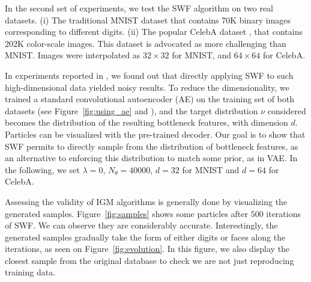 In the second set of experiments, we test the SWF algorithm on two real datasets. (i) The traditional MNIST dataset that contains 70K binary images corresponding to different digits. (ii) The popular CelebA dataset \cite{liu2015faceattributes}, that contains $202$K color-scale images. This dataset is advocated as more challenging than MNIST. Images were interpolated as $32\times 32$ for MNIST, and $64\times 64$ for CelebA.

In experiments reported in \supp, we found out that directly applying SWF to such high-dimensional data yielded noisy results. To reduce the dimensionality, we trained a standard convolutional autoencoder (AE) on the training set of both datasets (see Figure~\ref{fig:using_ae} and \supp), and the target distribution $\nu$ considered becomes the distribution of the resulting bottleneck features,
with dimension $d$. Particles can be visualized with the pre-trained decoder.
Our goal is to show that SWF permits to directly sample from the distribution of bottleneck features, as an alternative to enforcing this distribution to match some prior, as in VAE. In the following, we set $\lambda=0$, $N_\theta=40000$, $d=32$ for MNIST and $d=64$ for CelebA.


Assessing the validity of IGM algorithms is generally done by visualizing the generated samples. Figure~\ref{fig:samples} shows some particles after $500$ iterations of SWF. We can observe they are considerably accurate. Interestingly, the generated samples gradually take the form of either digits or faces along the iterations, as seen on Figure~\ref{fig:evolution}. In this figure, we also display the closest sample from the original database to check we are not just reproducing training data.

